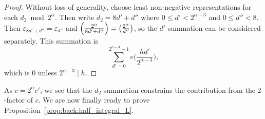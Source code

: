 \begin{proof}
  Without loss of generality, choose least non-negative representations for each $d_2 \bmod
  2^\alpha$.
  Then write $d_2 = 8d' + d''$ where $0 \leq d' < 2^{\alpha - 3}$ and $0 \leq d'' < 8$.
  Then $\varepsilon_{8d' + d''} = \varepsilon_{d''}$ and
  $\left(\frac{2^\alpha}{8d' + d''}\right) = \left(\frac{2^\alpha}{d''}\right)$, so the $d'$ summation can be
  considered separately.
  This summation is
  \begin{equation}
    \sum_{d' = 0}^{2^{\alpha-3} - 1} e \bigg( \frac{h d'}{2^{\alpha - 3}} \bigg),
  \end{equation}
  which is $0$ unless $2^{\alpha - 3} \mid h$.
%
\end{proof}


As $c = 2^\alpha c'$, we see that the $d_2$ summation constrains the contribution from the
$2$-factor of $c$.
We are now finally ready to prove Proposition~\ref{prop:back:half_integral_L}.


